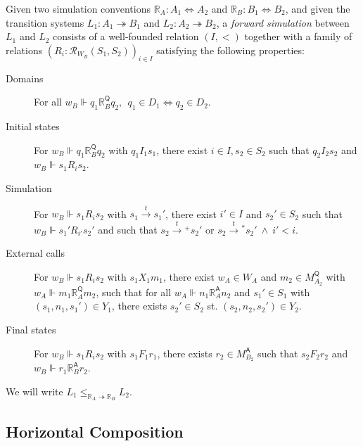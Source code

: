 \documentclass[sigplan,10pt,review,anonymous]{acmart}\settopmatter{printfolios=true,printccs=false,printacmref=false}
\newcommand{\kw}[1]{\ensuremath{ \mathsf{#1} }}
\begin{document}
\begin{definition}
Given
two simulation conventions
$\mathbb{R}_A : A_1 \Leftrightarrow A_2$ and
$\mathbb{R}_B : B_1 \Leftrightarrow B_2$,
and given
the transition systems
$L_1 : A_1 \twoheadrightarrow B_1$ and
$L_2 : A_2 \twoheadrightarrow B_2$,
a \emph{forward simulation} between $L_1$ and $L_2$
consists of a
well-founded relation $(I, <)$
together with a family of relations
$(R_i : \mathcal{R}_{W_B}(S_1, S_2))_{i \in I}$
satisfying the following properties:
\begin{description}
\item[Domains]
  For all
  $w_B \Vdash q_1 \mathrel{\mathbb{R}_B^\kw{Q}} q_2, \:\:
   q_1 \in D_1 \Leftrightarrow q_2 \in D_2$.
\item[Initial states]
  For
  $w_B \Vdash q_1 \mathrel{\mathbb{R}_B^\kw{Q}} q_2$
  with $q_1 \mathrel{I_1} s_1$,
  there exist $i \in I, s_2 \in S_2$
  such that $q_2 \mathrel{I_2} s_2$ and
  $w_B \Vdash s_1 \mathrel{R_i} s_2$.
\item[Simulation]
  For $w_B \Vdash s_1 \mathrel{R_i} s_2$
  with $s_1 \stackrel{t}{\rightarrow} s_1'$,
  there exist $i' \in I$ and $s_2' \in S_2$
  such that $w_B \Vdash s_1' \mathrel{R_{i'}} s_2'$ and
  such that
    $s_2 \mathrel{\stackrel{t}{\rightarrow}{\!\!}^+} s_2'$ or
    $s_2 \mathrel{\stackrel{t}{\rightarrow}{\!\!}^*} s_2' \:\wedge\: i' < i$.
\item[External calls]
  For $w_B \Vdash s_1 \mathrel{R_i} s_2$
  with $s_1 \mathrel{X_1} m_1$,
  there exist $w_A \in W_A$ and $m_2 \in M_{A_2}^\kw{Q}$
  with $w_A \Vdash m_1 \mathrel{\mathbb{R}_A^\kw{Q}} m_2$,
  such that for all
  $w_A \Vdash n_1 \mathrel{\mathbb{R}_A^\kw{A}} n_2$
  and $s_1' \in S_1$ with $(s_1, n_1, s_1') \in Y_1$,
  there exists $s_2' \in S_2$ st.
  $(s_2, n_2, s_2') \in Y_2$.
\item[Final states]
  For $w_B \Vdash s_1 \mathrel{R_i} s_2$
  with $s_1 \mathrel{F_1} r_1$,
  there exists $r_2 \in M_{B_2}^\kw{A}$ such that
  $s_2 \mathrel{F_2} r_2$ and $w_B \Vdash r_1 \mathrel{\mathbb{R}_B^\kw{A}} r_2$.
\end{description}
We will write $L_1 \le_{\mathbb{R}_A \twoheadrightarrow \mathbb{R}_B} L_2$.
\end{definition}


\subsection{Horizontal Composition} \label{sec:sem:linker} %
\end{document}
